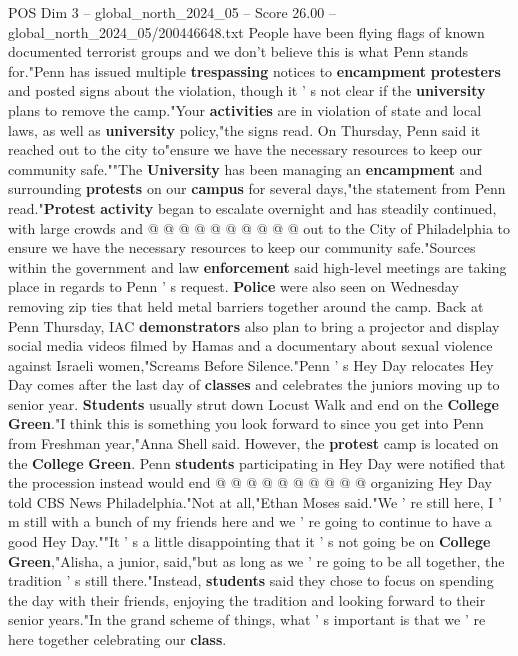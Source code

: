 \begin{textsample}{POS Dim 3 – global\_north\_2024\_05 – Score 26.00 – global\_north\_2024\_05/200446648.txt}
People have been flying flags of known documented terrorist groups and we don't believe this is what Penn stands for."Penn has issued multiple \textbf{trespassing} notices to \textbf{encampment} \textbf{protesters} and posted signs about the violation, though it ' s not clear if the \textbf{university} plans to remove the camp."Your \textbf{activities} are in violation of state and local laws, as well as \textbf{university} policy,"the signs read.
On Thursday, Penn said it reached out to the city to"ensure we have the necessary resources to keep our community safe.""The \textbf{University} has been managing an \textbf{encampment} and surrounding \textbf{protests} on our \textbf{campus} for several days,"the statement from Penn read."\textbf{Protest} \textbf{activity} began to escalate overnight and has steadily continued, with large crowds and @ @ @ @ @ @ @ @ @ @ out to the City of Philadelphia to ensure we have the necessary resources to keep our community safe."Sources within the government and law \textbf{enforcement} said high-level meetings are taking place in regards to Penn ' s request. \textbf{Police} were also seen on Wednesday removing zip ties that held metal barriers together around the camp.
Back at Penn Thursday, IAC \textbf{demonstrators} also plan to bring a projector and display social media videos filmed by Hamas and a documentary about sexual violence against Israeli women,"Screams Before Silence."Penn ' s Hey Day relocates Hey Day comes after the last day of \textbf{classes} and celebrates the juniors moving up to senior year. \textbf{Students} usually strut down Locust Walk and end on the \textbf{College} \textbf{Green}."I think this is something you look forward to since you get into Penn from Freshman year,"Anna Shell said.
However, the \textbf{protest} camp is located on the \textbf{College} \textbf{Green}.
Penn \textbf{students} participating in Hey Day were notified that the procession instead would end @ @ @ @ @ @ @ @ @ @ organizing Hey Day told CBS News Philadelphia."Not at all,"Ethan Moses said."We ' re still here, I ' m still with a bunch of my friends here and we ' re going to continue to have a good Hey Day.""It ' s a little disappointing that it ' s not going be on \textbf{College} \textbf{Green},"Alisha, a junior, said,"but as long as we ' re going to be all together, the tradition ' s still there."Instead, \textbf{students} said they chose to focus on spending the day with their friends, enjoying the tradition and looking forward to their senior years."In the grand scheme of things, what ' s important is that we ' re here together celebrating our \textbf{class}.

\end{textsample}
